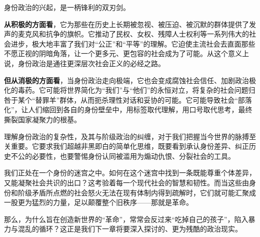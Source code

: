 身份政治的兴起，是一柄锋利的双刃剑。

\textbf{从积极的方面看}，它为那些在历史上长期被忽视、被压迫、被沉默的群体提供了发声的麦克风和抗争的旗帜。它推动了民权、女权、残障人士权利等一系列伟大的社会进步，极大地丰富了我们对“公正”和“平等”的理解。它迫使主流社会去直面那些不愿正视的阴暗角落，让一个更多元、更包容的社会成为了可能。从这个意义上说，身份政治是通往更深层次社会正义的必经之路。

\textbf{但从消极的方面看}，当身份政治走向极端，它也会变成腐蚀社会信任、加剧政治极化的毒药。它可能将世界简化为“我们”与“他们”的永恒对立，将复杂的社会问题归咎于某个“替罪羊”群体，从而扼杀理性对话和妥协的可能。它可能导致社会“部落化”，让人们缩回到各自的身份壁垒中，用标签取代理解，用口号取代思考，最终撕裂国家凝聚力的根基。

理解身份政治的复杂性，及其与阶级政治的纠缠，对于我们把握当今世界的脉搏至关重要。它要求我们超越非黑即白的简单化思维，既要看到承认身份差异、纠正历史不公的必要性，也要警惕身份认同被滥用为煽动仇恨、分裂社会的工具。

我们正处在一个身份的迷宫之中。如何在这个迷宫中找到一条既能尊重个体差异，又能凝聚社会共识的出口？这考验着每一个现代社会的智慧和韧性。而当这些由身份和阶级矛盾所点燃的社会怒火无法在现有体制内得到疏解时，它们就可能汇聚成一股更为猛烈的力量，足以颠覆整个旧秩序——那就是革命。

那么，为什么旨在创造新世界的“革命”，常常会反过来“吃掉自己的孩子”，陷入暴力与混乱的循环？这正是我们下一章将要深入探讨的、更为残酷的政治现实。

